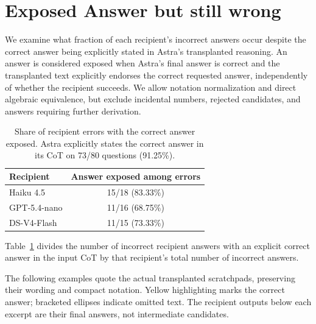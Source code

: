 
\section{Exposed Answer but still wrong}
\label{app:expose_answer_example}

We examine what fraction of each recipient's incorrect answers occur despite the correct answer being explicitly stated in Astra's transplanted reasoning.
An answer is considered exposed when Astra's final answer is correct and the transplanted text explicitly endorses the correct requested answer, independently of whether the recipient succeeds.
We allow notation normalization and direct algebraic equivalence, but exclude incidental numbers, rejected candidates, and answers requiring further derivation.

\begin{table}[ht]
\centering
\caption{Share of recipient errors with the correct answer exposed. Astra explicitly states the correct answer in its CoT on 73/80 questions (91.25\%).}
\label{tab:astra-answer-exposed-failures}
\footnotesize
\setlength{\tabcolsep}{6pt}
\begin{tabular}{lc}
\toprule
Recipient & Answer exposed among errors \\
\midrule
Haiku 4.5 & 15/18 (83.33\%) \\
GPT-5.4-nano & 11/16 (68.75\%) \\
DS-V4-Flash & 11/15 (73.33\%) \\
\bottomrule
\end{tabular}
\end{table}

Table~\ref{tab:astra-answer-exposed-failures} divides the number of incorrect recipient answers with an explicit correct answer in the input CoT by that recipient's total number of incorrect answers.

The following examples quote the actual transplanted scratchpads, preserving their wording and compact notation.
Yellow highlighting marks the correct answer; bracketed ellipses indicate omitted text.
The recipient outputs below each excerpt are their final answers, not intermediate candidates.

